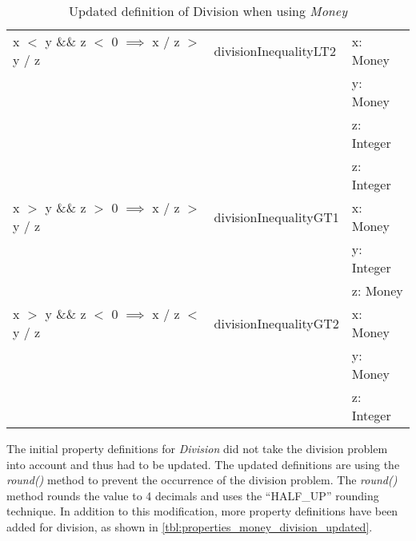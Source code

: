 \begin{table}[!ht]
\begin{tabular}{lll}
\rowcolor[HTML]{EFEFEF} x $<$ y \&\& z $<$ 0 $\implies$ x / z $>$ y / z              & divisionInequalityLT2  & x: Money                 \\
\rowcolor[HTML]{EFEFEF}                                                              &                        & y: Money                 \\
\rowcolor[HTML]{EFEFEF}                                                              &                        & z: Integer               \\
\rowcolor[HTML]{EFEFEF}                                                              &                        & z: Integer               \\
												x $>$ y \&\& z $>$ 0 $\implies$ x / z $>$ y / z              & divisionInequalityGT1  & x: Money                 \\
																																										 &                        & y: Integer               \\
																																										 &                        & z: Money                 \\
\rowcolor[HTML]{EFEFEF} x $>$ y \&\& z $<$ 0 $\implies$ x / z $<$ y / z              & divisionInequalityGT2  & x: Money                 \\
\rowcolor[HTML]{EFEFEF}                                                              &                        & y: Money                 \\
\rowcolor[HTML]{EFEFEF}                                                              &                        & z: Integer               \\ \hline
\end{tabular}
\caption{Updated definition of Division when using \textit{Money}}
\label{tbl:properties_money_division_updated}
\end{table}
\FloatBarrier
The initial property definitions for \textit{Division} did not take the division
problem into account and thus had to be updated. The updated definitions are
using the \textit{round()} method to prevent the occurrence of the division
problem. The \textit{round()} method rounds the value to 4 decimals and uses the
``HALF\_UP'' rounding technique. In addition to this modification, more property
definitions have been added for division, as shown in
\autoref{tbl:properties_money_division_updated}.

